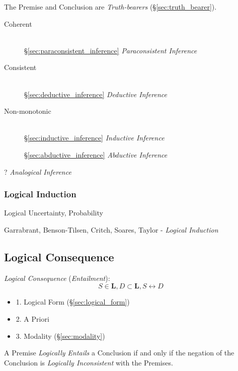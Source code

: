 The Premise and Conclusion are \emph{Truth-bearers}
(\S\ref{sec:truth_bearer}).

\begin{description}
\item [Coherent] \hfill\\
  \S\ref{sec:paraconsistent_inference}
  \emph{Paraconsistent Inference}

\item [Consistent] \hfill\\
  \S\ref{sec:deductive_inference} \emph{Deductive Inference}

\item [Non-monotonic] \hfill\\
  \S\ref{sec:inductive_inference} \emph{Inductive Inference}

  \S\ref{sec:abductive_inference} \emph{Abductive Inference}

\end{description}

? \emph{Analogical Inference}



\subsubsection{Logical Induction}\label{sec:logical_induction}

Logical Uncertainty, Probability

Garrabrant, Benson-Tilsen, Critch, Soares, Taylor - \emph{Logical
  Induction} %



\subsection{Logical Consequence}\label{sec:logical_consequence}
\cite{beall-restall05}

\emph{Logical Consequence} (\emph{Entailment}):
\[
  S \in \mathbf{L}, D \subset \mathbf{L}, S \leftrightarrow D
\]
\begin{itemize}
  \item 1. Logical Form (\S\ref{sec:logical_form})
  \item 2. A Priori
  \item 3. Modality (\S\ref{sec:modality})
\end{itemize}

A Premise \emph{Logically Entails} a Conclusion if and only if the
negation of the Conclusion is \emph{Logically Inconsistent} with the
Premises.



